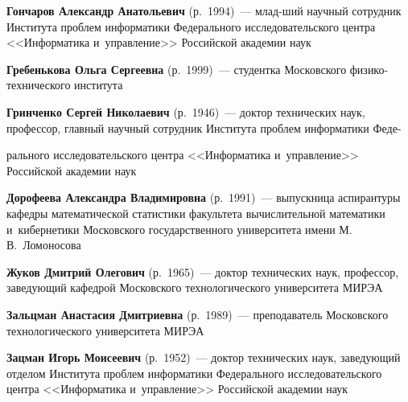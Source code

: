 \begin{multicols}{2}
\noindent
\textbf{Гончаров Александр Анатольевич} (р.\ 1994)~---
млад-\linebreak ший научный сотрудник Института проб\-лем информатики Федерального исследовательского цент\-ра 
<<Информатика и~управ\-ле\-ние>> Российской академии наук

   \vspace*{3pt}
   
   \noindent
\textbf{Гребенькова Ольга Сергеевна} (р.\ 1999)~--- студентка Московского 
фи\-зи\-ко-тех\-ни\-че\-ско\-го института

   \vspace*{3pt}
   
\noindent
\textbf{Гринченко Сергей Николаевич} (р.\ 1946)~--- доктор технических наук, 
профессор, главный научный сотрудник Института проб\-лем информатики Феде-\linebreak\vspace*{-12pt}

\columnbreak

\noindent
рального исследовательского центра 
<<Информатика и~управ\-ле\-ние>> Российской академии наук

   \vspace*{3pt}
   
\noindent
\textbf{Дорофеева Александра Владимировна} (р.\ 1991)~--- 
выпускница аспирантуры кафедры математической статистики факультета вычислительной математики 
и~кибернетики Московского государственного университета имени М.\,В.~Ломоносова

\vspace*{3pt}


   
\noindent
  \textbf{Жуков Дмитрий Олегович} (р.\ 1965)~--- доктор технических наук, профессор, 
  за\-ве\-ду\-ющий ка\-фед\-рой Московского технологического университета МИРЭА 
  

   \vspace*{3pt}
   
     \noindent
  \textbf{Зальцман Анастасия Дмитриевна} (р.\ 1989)~--- 
  преподаватель Московского технологического университета МИРЭА
  
     \vspace*{3pt}
     
  \noindent
\textbf{Зацман Игорь Моисеевич} (р.\ 1952)~--- доктор технических наук, за\-ве\-ду\-ющий
 отделом Института проб\-лем информатики Федерального исследовательского цент\-ра 
 <<Информатика и~управ\-ле\-ние>> \mbox{Российской} академии наук


\end{multicols}
